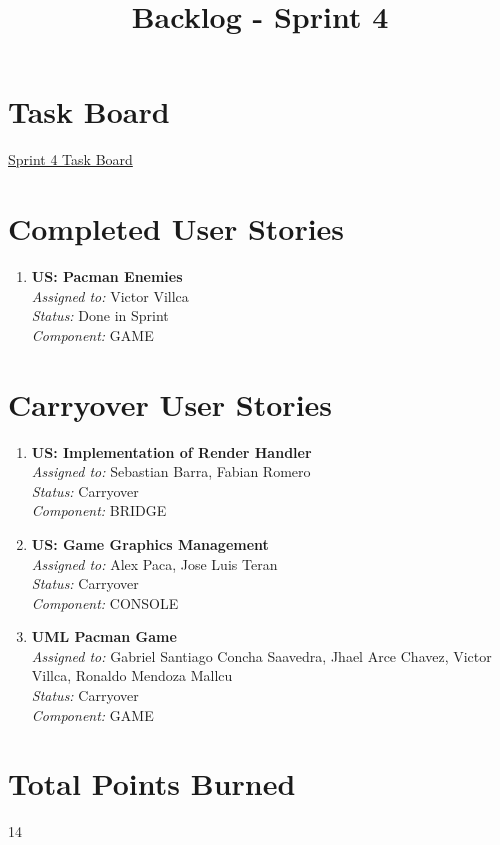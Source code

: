 \documentclass{article}
\begin{document}
    \title{Backlog - Sprint 4}
    \author{}
    \date{}
    \maketitle

    \section*{Task Board}
    \href{https://tree.taiga.io/project/joseluis-teran-coffeetime/taskboard/sprint-4-6137}{Sprint 4 Task Board}

    \section*{Completed User Stories}

    \begin{enumerate}
        \item \textbf{US: Pacman Enemies} \\
        \textit{Assigned to:} Victor Villca \\
        \textit{Status:} Done in Sprint \\
        \textit{Component:} GAME
    \end{enumerate}

    \section*{Carryover User Stories}

    \begin{enumerate}
        \item \textbf{US: Implementation of Render Handler} \\
        \textit{Assigned to:} Sebastian Barra, Fabian Romero \\
        \textit{Status:} Carryover \\
        \textit{Component:} BRIDGE
        \item \textbf{US: Game Graphics Management} \\
        \textit{Assigned to:} Alex Paca, Jose Luis Teran \\
        \textit{Status:} Carryover \\
        \textit{Component:} CONSOLE
        \item \textbf{UML Pacman Game} \\
        \textit{Assigned to:} Gabriel Santiago Concha Saavedra, Jhael Arce Chavez, Victor Villca, Ronaldo Mendoza Mallcu \\
        \textit{Status:} Carryover \\
        \textit{Component:} GAME
    \end{enumerate}

    \section*{Total Points Burned}
    14
\end{document}
